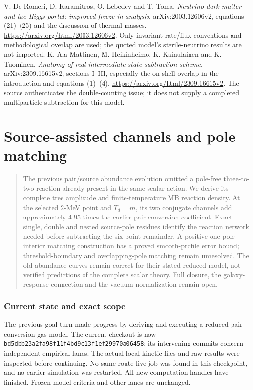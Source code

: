 \documentclass[11pt]{article}
\begin{document}
\begin{thebibliography}{9}
 V. De Romeri, D. Karamitros, O. Lebedev and T. Toma,
\emph{Neutrino dark matter and the Higgs portal: improved freeze-in analysis},
arXiv:2003.12606v2, equations (21)--(25) and the discussion of thermal masses.
\url{https://arxiv.org/html/2003.12606v2}.
Only invariant rate/flux conventions and methodological overlap are used;
the quoted model's sterile-neutrino results are not imported.
 K. Ala-Mattinen, M. Heikinheimo, K. Kainulainen and K. Tuominen,
\emph{Anatomy of real intermediate state-subtraction scheme},
arXiv:2309.16615v2, sections I--III, especially the on-shell overlap in
the introduction and equations (1)--(4).
\url{https://arxiv.org/html/2309.16615v2}.
The source authenticates the double-counting issue; it does not supply a
completed multiparticle subtraction for this model.
\end{thebibliography}

\clearpage

\part{Source-assisted channels and pole matching}

\begin{abstract}
The previous pair/source abundance evolution omitted a pole-free
three-to-two reaction already present in the same scalar action.
We derive its complete tree amplitude and finite-temperature MB reaction
density. At the selected 2-MeV point and $T_d=m$, its two conjugate channels
add approximately 4.95 times the earlier pair-conversion coefficient.
Exact single, double and nested source-pole residues identify the reaction
network needed before subtracting the six-point remainder. A positive
one-pole interior matching construction has a proved smooth-profile error
bound; threshold-boundary and overlapping-pole matching remain unresolved.
The old abundance curves remain correct for their stated reduced model,
not verified predictions of the complete scalar theory. Full closure,
the galaxy-response connection and the vacuum normalization remain open.
\end{abstract}

\section{Current state and exact scope}
The previous goal turn made progress by deriving and executing a reduced
pair-conversion gas model. The current checkout is now
\texttt{bd5dbb23a2fa98f11f4bd9c13f1ef29970a06458}; its intervening commits
concern independent empirical lanes. The actual local kinetic files and
raw results were inspected before continuing. No same-route live job was
found in this checkpoint, and no earlier simulation was restarted.
All new computation handles have finished. Frozen model criteria and
other lanes are unchanged.
\end{document}
